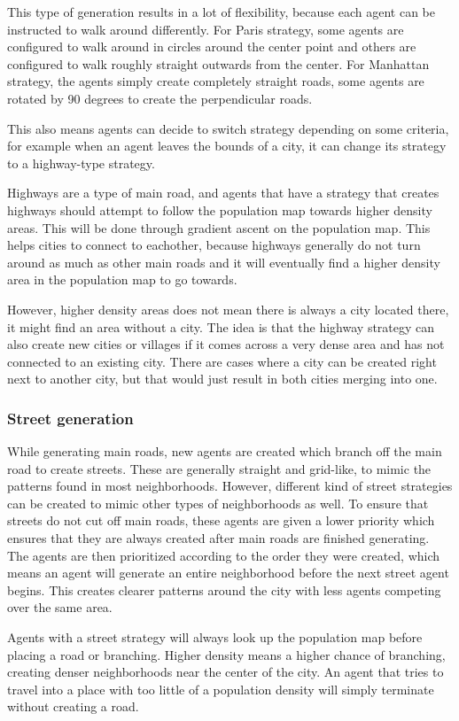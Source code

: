 This type of generation results in a lot of flexibility, because each agent can be instructed to walk around differently.
For Paris strategy, some agents are configured to walk around in circles around the center point and others are configured to walk roughly straight outwards from the center.
For Manhattan strategy, the agents simply create completely straight roads, some agents are rotated by 90 degrees to create the perpendicular roads.

This also means agents can decide to switch strategy depending on some criteria, for example when an agent leaves the bounds of a city, it can change its strategy to a highway-type strategy.

Highways are a type of main road, and agents that have a strategy that creates highways should attempt to follow the population map towards higher density areas.
This will be done through gradient ascent on the population map.
This helps cities to connect to eachother, because highways generally do not turn around as much as other main roads and it will eventually find a higher density area in the population map to go towards.

However, higher density areas does not mean there is always a city located there, it might find an area without a city.
The idea is that the highway strategy can also create new cities or villages if it comes across a very dense area and has not connected to an existing city.
There are cases where a city can be created right next to another city, but that would just result in both cities merging into one.

\subsubsection{Street generation}
While generating main roads, new agents are created which branch off the main road to create streets.
These are generally straight and grid-like, to mimic the patterns found in most neighborhoods.
However, different kind of street strategies can be created to mimic other types of neighborhoods as well.
To ensure that streets do not cut off main roads, these agents are given a lower priority which ensures that they are always created after main roads are finished generating.
The agents are then prioritized according to the order they were created, which means an agent will generate an entire neighborhood before the next street agent begins.
This creates clearer patterns around the city with less agents competing over the same area.

Agents with a street strategy will always look up the population map before placing a road or branching.
Higher density means a higher chance of branching, creating denser neighborhoods near the center of the city.
An agent that tries to travel into a place with too little of a population density will simply terminate without creating a road. 
